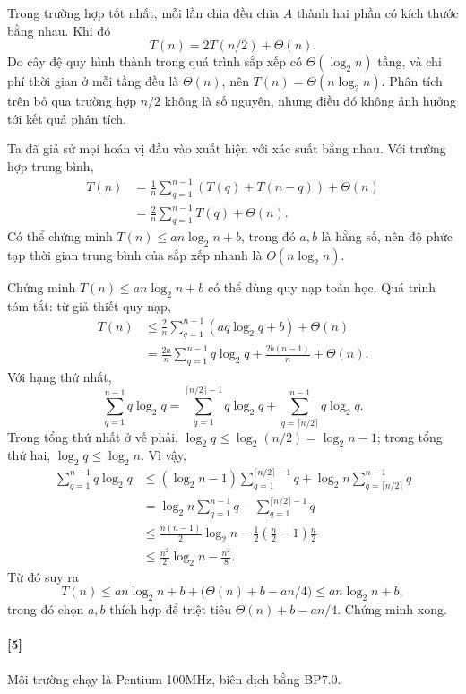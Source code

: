 \documentclass[11pt]{article}
\begin{document}
Trong trường hợp tốt nhất, mỗi lần chia đều chia \(A\) thành hai phần có kích
thước bằng nhau. Khi đó
\[
  T(n)=2T(n/2)+\Theta(n).
\]
Do cây đệ quy hình thành trong quá trình sắp xếp có \(\Theta(\log_2 n)\) tầng,
và chi phí thời gian ở mỗi tầng đều là \(\Theta(n)\), nên
\(T(n)=\Theta(n\log_2 n)\). Phân tích trên bỏ qua trường hợp \(n/2\) không là
số nguyên, nhưng điều đó không ảnh hưởng tới kết quả phân tích.

Ta đã giả sử mọi hoán vị đầu vào xuất hiện với xác suất bằng nhau. Với trường
hợp trung bình,
\[
\begin{aligned}
T(n)
&= \frac{1}{n}\sum_{q=1}^{n-1}(T(q)+T(n-q))+\Theta(n)\\
&= \frac{2}{n}\sum_{q=1}^{n-1}T(q)+\Theta(n).
\end{aligned}
\]
Có thể chứng minh \(T(n)\le an\log_2 n+b\), trong đó \(a,b\) là hằng số, nên
độ phức tạp thời gian trung bình của sắp xếp nhanh là \(O(n\log_2 n)\).

Chứng minh \(T(n)\le an\log_2 n+b\) có thể dùng quy nạp toán học. Quá trình
tóm tắt: từ giả thiết quy nạp,
\[
\begin{aligned}
T(n)
&\le \frac{2}{n}\sum_{q=1}^{n-1}(aq\log_2 q+b)+\Theta(n)\\
&= \frac{2a}{n}\sum_{q=1}^{n-1}q\log_2 q + \frac{2b(n-1)}{n}+\Theta(n).
\end{aligned}
\]
Với hạng thứ nhất,
\[
  \sum_{q=1}^{n-1}q\log_2 q
  = \sum_{q=1}^{\lceil n/2\rceil-1}q\log_2 q
    + \sum_{q=\lceil n/2\rceil}^{n-1}q\log_2 q.
\]
Trong tổng thứ nhất ở vế phải,
\(\log_2 q\le\log_2(n/2)=\log_2 n-1\); trong tổng thứ hai,
\(\log_2 q\le\log_2 n\). Vì vậy,
\[
\begin{aligned}
\sum_{q=1}^{n-1}q\log_2 q
&\le (\log_2 n-1)\sum_{q=1}^{\lceil n/2\rceil-1}q
  + \log_2 n\sum_{q=\lceil n/2\rceil}^{n-1}q\\
&= \log_2 n\sum_{q=1}^{n-1}q
  - \sum_{q=1}^{\lceil n/2\rceil-1}q\\
&\le \frac{n(n-1)}{2}\log_2 n
  - \frac{1}{2}\left(\frac{n}{2}-1\right)\frac{n}{2}\\
&\le \frac{n^2}{2}\log_2 n - \frac{n^2}{8}.
\end{aligned}
\]
Từ đó suy ra
\[
  T(n)\le an\log_2 n+b+\bigl(\Theta(n)+b-an/4\bigr)\le an\log_2 n+b,
\]
trong đó chọn \(a,b\) thích hợp để triệt tiêu
\(\Theta(n)+b-an/4\). Chứng minh xong.

\paragraph{[5]}
Môi trường chạy là Pentium 100MHz, biên dịch bằng BP7.0.
\end{document}
